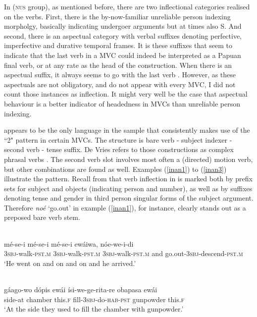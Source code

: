 In  (\textsc{nus} group), as mentioned before, there are two inflectional categories realised on the verbs. First, there is the by-now-familiar unreliable person indexing morpholgy, basically indicating undergoer arguments but at times also S. And second, there is an aspectual category with verbal suffixes denoting perfective, imperfective and durative temporal frames. It is these suffixes that seem to indicate that the last verb in a MVC could indeed be interpreted as a Papuan final verb, or at any rate as the head of the construction. When there is an aspectual suffix, it always seems to go with the last verb \citep[350]{kratochvil2007grammar}. However, as these aspectuals are not obligatory, and do not appear with every MVC, I did not count those instances as inflection. It might very well be the case that aspectual behaviour is a better indicator of headedness in  MVCs than unreliable person indexing.  

\largerpage[1]
 appears to be the only language in the sample that consistently makes use of the ``2" pattern in certain MVCs. The structure is bare verb - subject indexer - second verb - tense suffix. De Vries refers to those constructions as complex phrasal verbs \citep[57]{devries2004}. The second verb slot involves most often a (directed) motion verb, but other combinations are found as well. Examples (\ref{inan1}) to (\ref{inan3}) illustrate the pattern. Recall from  that verb inflection in  is marked both by prefix sets for subject and objects (indicating person and number), as well as by suffixes denoting tense and gender in third person singular forms of the subject argument. Therefore \textit{noé} `go.out' in example (\ref{inan1}), for instance, clearly stands out as a preposed bare verb stem.

\ea \label{inan1}
\\
\gll mé-se-i mé-se-i mé-se-i ewáiwa, nóe-we-i-di \\
3\textsc{sbj}-walk-\textsc{pst}.\textsc{m} 3\textsc{sbj}-walk-\textsc{pst}.\textsc{m} 3\textsc{sbj}-walk-\textsc{pst}.\textsc{m} and go.out-3\textsc{sbj}-descend-\textsc{pst}.\textsc{m} \\
\glft `He went on and on and on and he arrived.' \\ 
\z

\ea \label{inan2}
\\
\gll gáago-wo dópis ewái ísi-we-ge-rita-re obapasa ewái \\
side-at chamber this.\textsc{f} fill-3\textsc{sbj}-do-\textsc{hab}-\textsc{pst} gunpowder this.\textsc{f} \\
\glft `At the side they used to fill the chamber with gunpowder.'\\ 
\z

